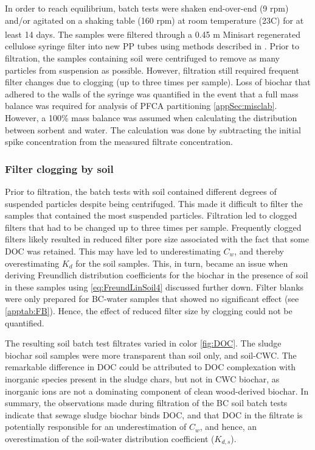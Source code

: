 In order to reach equilibrium, batch tests were shaken end-over-end (9 rpm) and/or agitated on a shaking table (160 rpm) at room temperature (23\textdegree C) for at least 14 days\citep{higgins2006sorption}. The samples were filtered through a 0.45 \textmu m Minisart\textsuperscript{\textregistered} regenerated cellulose syringe filter into new \acrshort{PP} tubes using methods described in \cite{Sorengard2019}. Prior to filtration, the samples containing soil were centrifuged to remove as many particles from suspension as possible. However, filtration still required frequent filter changes due to clogging (up to three times per sample). Loss of biochar that adhered to the walls of the syringe was quantified in the event that a full mass balance was required for analysis of PFCA partitioning \cref{appSec:misclab}. However, a 100\% mass balance was assumed when calculating the distribution between sorbent and water. The calculation was done by subtracting the initial spike concentration from the measured filtrate concentration.

\subsubsection{Filter clogging by soil}\label{sec:Soil}
Prior to filtration, the batch tests with soil contained different degrees of suspended particles despite being centrifuged. This made it difficult to filter the samples that contained the most suspended particles. Filtration led to clogged filters that had to be changed up to three times per sample. Frequently clogged filters likely resulted in reduced filter pore size associated with the fact that some DOC was retained. This may have led to underestimating $C_w$, and thereby overestimating $K_d$ for the soil samples. This, in turn, became an issue when deriving Freundlich distribution coefficients for the biochar in the presence of soil in these samples using \cref{eq:FreundLinSoil4} discussed further down. Filter blanks were only prepared for BC-water samples that showed no significant effect (see \cref{apptab:FB}). Hence, the effect of reduced filter size by clogging could not be quantified. 

The resulting soil batch test filtrates varied in color \cref{fig:DOC}. The sludge biochar soil samples were more transparent than soil only, and soil-CWC. The remarkable difference in DOC could be attributed to DOC complexation with inorganic species present in the sludge chars, but not in CWC biochar, as inorganic ions are not a dominating component of clean wood-derived biochar. In summary, the observations made during filtration of the BC soil batch tests indicate that sewage sludge biochar binds DOC, and that DOC in the filtrate is potentially responsible for an underestimation of $C_w$, and hence, an overestimation of the soil-water distribution coefficient ($K_{d,s}$). 

